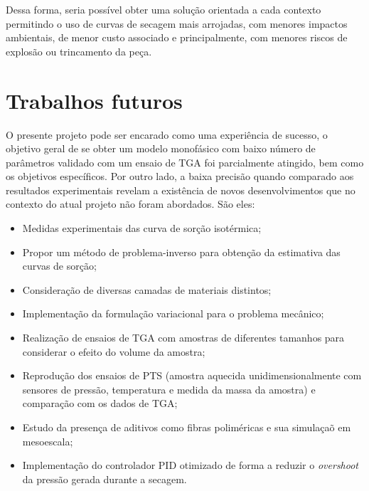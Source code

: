 Dessa forma, seria possível obter uma solução orientada a cada contexto
permitindo o uso de curvas de secagem mais arrojadas, com menores impactos
ambientais, de menor custo associado e principalmente, com menores riscos de
explosão ou trincamento da peça.

\section{Trabalhos futuros}
O presente projeto pode ser encarado como uma experiência de sucesso, o objetivo
geral de se obter um modelo monofásico com baixo número de parâmetros validado
com um ensaio de TGA foi parcialmente atingido, bem como os objetivos
específicos. Por outro lado, a baixa precisão quando comparado aos resultados
experimentais revelam a existência de novos desenvolvimentos que no contexto do
atual projeto não foram abordados. São eles:

\begin{itemize}
    \item Medidas experimentais das curva de sorção isotérmica;
    \item Propor um método de problema-inverso para obtenção da estimativa das
      curvas de sorção;
    \item Consideração de diversas camadas de materiais distintos;
    \item Implementação da formulação variacional para o problema mecânico;
    \item Realização de ensaios de TGA com amostras de diferentes tamanhos para
      considerar o efeito do volume da amostra;
    \item Reprodução dos ensaios de PTS (amostra aquecida unidimensionalmente com
      sensores de pressão, temperatura e medida da massa da amostra) e
      comparação com os dados de TGA;
    \item Estudo da presença de aditivos como fibras poliméricas e sua simulaçaõ
      em mesoescala;
    \item Implementação do controlador PID otimizado de forma a reduzir o {\it
        overshoot} da pressão gerada durante a secagem.
\end{itemize}


